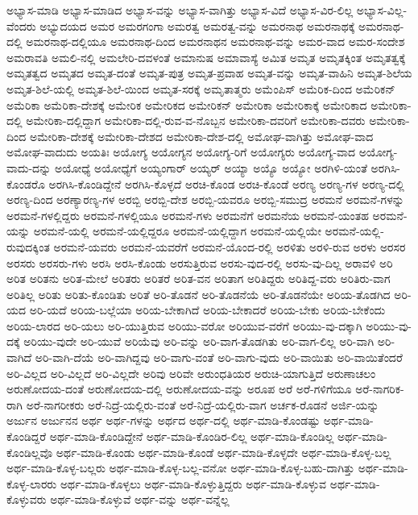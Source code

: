 {ಅಭ್ಯಾಸ-ಮಾಡಿ
ಅಭ್ಯಾಸ-ಮಾಡಿದ
ಅಭ್ಯಾಸ-ವನ್ನು
ಅಭ್ಯಾಸ-ವಾಗಿತ್ತು
ಅಭ್ಯಾಸ-ವಿದೆ
ಅಭ್ಯಾಸ-ವಿರ-ಲಿಲ್ಲ
ಅಭ್ಯಾಸ-ವಿಲ್ಲ-ವೆಂದರು
ಅಭ್ಯುದಯದ
ಅಮರ
ಅಮರಗಂಗಾ
ಅಮರತ್ವ
ಅಮರತ್ವ-ವನ್ನು
ಅಮರನಾಥ
ಅಮರನಾಥಕ್ಕೆ
ಅಮರನಾಥ-ದಲ್ಲಿ
ಅಮರನಾಥ-ದಲ್ಲಿಯೂ
ಅಮರನಾಥ-ದಿಂದ
ಅಮರನಾಥನ
ಅಮರನಾಥ-ವನ್ನು
ಅಮರ-ವಾದ
ಅಮರ-ಸಂದೇಶ
ಅಮರಾವತಿ
ಅಮಲಿ-ನಲ್ಲಿ
ಅಮಲೇರಿ-ದವಳಂತೆ
ಅಮಾನುಷ
ಅಮಾವಾಸ್ಯೆ
ಅಮಿತ
ಅಮೃತ
ಅಮೃತಕ್ಕಿಂತ
ಅಮೃತತ್ವಕ್ಕೆ
ಅಮೃತತ್ವದ
ಅಮೃತದ
ಅಮೃತ-ದಂತೆ
ಅಮೃತ-ಪುತ್ರ
ಅಮೃತ-ಪ್ರವಾಹ
ಅಮೃತ-ವನ್ನು
ಅಮೃತ-ವಾಹಿನಿ
ಅಮೃತ-ಶಿಲೆಯ
ಅಮೃತ-ಶಿಲೆ-ಯಲ್ಲಿ
ಅಮೃತ-ಶಿಲೆ-ಯಿಂದ
ಅಮೃತ-ಸರಕ್ಕೆ
ಅಮೃತಾತ್ಮರು
ಅಮೆಂಪಿಸ್
ಅಮೆರಿಕ-ದಿಂದ
ಅಮೆರಿಕನ್
ಅಮೆರಿಕಾ
ಅಮೆರಿಕಾ-ದೇಶಕ್ಕೆ
ಅಮೇರಿಕ
ಅಮೇರಿಕದ
ಅಮೇರಿಕನ್
ಅಮೇರಿಕಾ
ಅಮೇರಿಕಾಕ್ಕೆ
ಅಮೇರಿಕಾದ
ಅಮೇರಿಕಾ-ದಲ್ಲಿ
ಅಮೇರಿಕಾ-ದಲ್ಲಿದ್ದಾಗ
ಅಮೇರಿಕಾ-ದಲ್ಲಿ-ರುವ-ವ-ನೊಬ್ಬನ
ಅಮೇರಿಕಾ-ದವರಿಗೆ
ಅಮೇರಿಕಾ-ದವರು
ಅಮೇರಿಕಾ-ದಿಂದ
ಅಮೇರಿಕಾ-ದೇಶಕ್ಕೆ
ಅಮೇರಿಕಾ-ದೇಶದ
ಅಮೇರಿಕಾ-ದೇಶ-ದಲ್ಲಿ
ಅಮೋಘ-ವಾಗಿತ್ತು
ಅಮೋಘ-ವಾದ
ಅಮೋಘ-ವಾದುದು
ಅಯತಿಃ
ಅಯೋಗ್ಯ
ಅಯೋಗ್ಯನ
ಅಯೋಗ್ಯ-ರಿಗೆ
ಅಯೋಗ್ಯರು
ಅಯೋಗ್ಯ-ವಾದ
ಅಯೋಗ್ಯ-ವಾದು-ದನ್ನು
ಅಯೋಧ್ಯೆ
ಅಯೋಧ್ಯೆಗೆ
ಅಯ್ಯಂಗಾರ್
ಅಯ್ಯರ್
ಅಯ್ಯಾ
ಅಯ್ಯೊ
ಅಯ್ಯೋ
ಅರಗಿಳಿ-ಯಂತೆ
ಅರಗಿಸಿ-ಕೊಂಡರೊ
ಅರಗಿಸಿ-ಕೊಂಡಿದ್ದೇನೆ
ಅರಗಿಸಿ-ಕೊಳ್ಳದೆ
ಅರಚಿ-ಕೊಂಡ
ಅರಚಿ-ಕೊಂಡೆ
ಅರಣ್ಯ
ಅರಣ್ಯ-ಗಳ
ಅರಣ್ಯ-ದಲ್ಲಿ
ಅರಣ್ಯ-ದಿಂದ
ಅರಣ್ಯಾರಣ್ಯ-ಗಳ
ಅರಬ್ಬಿ
ಅರಬ್ಬಿ-ದೇಶ
ಅರಬ್ಬಿ-ಯವರೂ
ಅರಬ್ಬಿ-ಸಮುದ್ರ
ಅರಮನೆ
ಅರಮನೆ-ಗಳನ್ನು
ಅರಮನೆ-ಗಳಲ್ಲಿದ್ದರು
ಅರಮನೆ-ಗಳಲ್ಲಿಯೂ
ಅರಮನೆ-ಗಳು
ಅರಮನೆಗೆ
ಅರಮನೆಯ
ಅರಮನೆ-ಯಂತಹ
ಅರಮನೆ-ಯನ್ನು
ಅರಮನೆ-ಯಲ್ಲಿ
ಅರಮನೆ-ಯಲ್ಲಿದ್ದರೂ
ಅರಮನೆ-ಯಲ್ಲಿದ್ದಾಗ
ಅರಮನೆ-ಯಲ್ಲಿಯೇ
ಅರಮನೆ-ಯಲ್ಲಿ-ರುವುದಕ್ಕಿಂತ
ಅರಮನೆ-ಯವರು
ಅರಮನೆ-ಯವರೆಗೆ
ಅರಮನೆ-ಯೊಂದ-ರಲ್ಲಿ
ಅರಳಿತು
ಅರಳಿ-ರುವ
ಅರಳು
ಅರಸರ
ಅರಸರು
ಅರಸರು-ಗಳು
ಅರಸಿ
ಅರಸಿ-ಕೊಂಡು
ಅರಸುತ್ತಿರುವ
ಅರಸು-ವುದ-ರಲ್ಲಿ
ಅರಸು-ವು-ದಿಲ್ಲ
ಅರಾವಳಿ
ಅರಿ
ಅರಿತ
ಅರಿತನು
ಅರಿತ-ಮೇಲೆ
ಅರಿತರು
ಅರಿತರೆ
ಅರಿತ-ವನ
ಅರಿತಾಗ
ಅರಿತಿದ್ದರು
ಅರಿತಿದ್ದ-ವರು
ಅರಿತಿರು-ವಾಗ
ಅರಿತಿಲ್ಲ
ಅರಿತು
ಅರಿತು-ಕೊಂಡಿತು
ಅರಿತೆ
ಅರಿ-ತೊಡನೆ
ಅರಿ-ತೊಡನೆಯೆ
ಅರಿ-ತೊಡನೆಯೇ
ಅರಿಯ-ತೊಡಗಿದ
ಅರಿ-ಯದ
ಅರಿ-ಯದೆ
ಅರಿಯ-ಬಲ್ಲೆಯಾ
ಅರಿಯ-ಬೇಕಾಗಿದೆ
ಅರಿಯ-ಬೇಕಾದರೆ
ಅರಿಯ-ಬೇಕು
ಅರಿಯ-ಬೇಕೆಂದು
ಅರಿಯ-ಲಾರದ
ಅರಿ-ಯಲು
ಅರಿ-ಯುತ್ತಿರುವ
ಅರಿಯು-ವರೋ
ಅರಿಯುವ-ವರೆಗೆ
ಅರಿಯು-ವು-ದಕ್ಕಾಗಿ
ಅರಿಯು-ವು-ದಕ್ಕೆ
ಅರಿಯು-ವುದೇ
ಅರಿ-ಯುವೆ
ಅರಿಯೆವು
ಅರಿ-ವನ್ನು
ಅರಿ-ವಾಗ-ತೊಡಗಿತು
ಅರಿ-ವಾಗ-ಲಿಲ್ಲ
ಅರಿ-ವಾಗಿ
ಅರಿ-ವಾಗಿದೆ
ಅರಿ-ವಾಗಿ-ದೆಯೆ
ಅರಿ-ವಾಗಿದ್ದವು
ಅರಿ-ವಾಗು-ವಂತೆ
ಅರಿ-ವಾಗು-ವುದು
ಅರಿ-ವಾಯಿತು
ಅರಿ-ವಾಯಿತೆಂದರೆ
ಅರಿ-ವಿಲ್ಲದ
ಅರಿ-ವಿಲ್ಲದೆ
ಅರಿ-ವಿಲ್ಲದೇ
ಅರಿವು
ಅರಿವೇ
ಅರುಂಧತಿಯರ
ಅರುಚಿ-ಯಾಗುತ್ತಿದೆ
ಅರುಣಾಚಲಂ
ಅರುಣೋದಯ-ದಂತೆ
ಅರುಣೋದಯ-ದಲ್ಲಿ
ಅರುಣೋದಯ-ವನ್ನು
ಅರೂಪ
ಅರೆ
ಅರೆ-ಗಳಿಗೆಯೂ
ಅರೆ-ನಾಗರಿಕ-ರಾಗಿ
ಅರೆ-ನಾಗರೀಕರು
ಅರೆ-ನಿದ್ರೆ-ಯಲ್ಲಿರು-ವಂತೆ
ಅರೆ-ನಿದ್ರೆ-ಯಲ್ಲಿರು-ವಾಗ
ಅರ್ಚಕ-ರೊಡನೆ
ಅರ್ಜಿ-ಯನ್ನು
ಅರ್ಜುನ
ಅರ್ಜುನನ
ಅರ್ಥ
ಅರ್ಥ-ಗಳನ್ನು
ಅರ್ಥದ
ಅರ್ಥ-ದಲ್ಲಿ
ಅರ್ಥ-ಮಾಡಿ-ಕೊಂಡಷ್ಟು
ಅರ್ಥ-ಮಾಡಿ-ಕೊಂಡಿದ್ದರೆ
ಅರ್ಥ-ಮಾಡಿ-ಕೊಂಡಿದ್ದೇನೆ
ಅರ್ಥ-ಮಾಡಿ-ಕೊಂಡಿರ-ಲಿಲ್ಲ
ಅರ್ಥ-ಮಾಡಿ-ಕೊಂಡಿಲ್ಲ
ಅರ್ಥ-ಮಾಡಿ-ಕೊಂಡಿಲ್ಲವೊ
ಅರ್ಥ-ಮಾಡಿ-ಕೊಂಡು
ಅರ್ಥ-ಮಾಡಿ-ಕೊಂಡೆ
ಅರ್ಥ-ಮಾಡಿ-ಕೊಳ್ಳದೇ
ಅರ್ಥ-ಮಾಡಿ-ಕೊಳ್ಳ-ಬಲ್ಲ
ಅರ್ಥ-ಮಾಡಿ-ಕೊಳ್ಳ-ಬಲ್ಲರು
ಅರ್ಥ-ಮಾಡಿ-ಕೊಳ್ಳ-ಬಲ್ಲ-ವನೋ
ಅರ್ಥ-ಮಾಡಿ-ಕೊಳ್ಳ-ಬಹು-ದಾಗಿತ್ತು
ಅರ್ಥ-ಮಾಡಿ-ಕೊಳ್ಳ-ಲಾರರು
ಅರ್ಥ-ಮಾಡಿ-ಕೊಳ್ಳಲು
ಅರ್ಥ-ಮಾಡಿ-ಕೊಳ್ಳುತ್ತಿದ್ದರು
ಅರ್ಥ-ಮಾಡಿ-ಕೊಳ್ಳುವ
ಅರ್ಥ-ಮಾಡಿ-ಕೊಳ್ಳುವರು
ಅರ್ಥ-ಮಾಡಿ-ಕೊಳ್ಳುವೆ
ಅರ್ಥ-ವನ್ನು
ಅರ್ಥ-ವನ್ನೆಲ್ಲ
}
